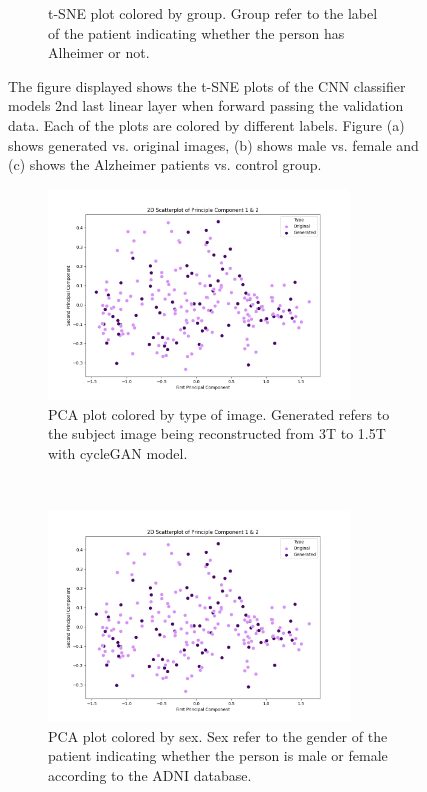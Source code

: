 \documentclass[12pt, fleqn, titlepage]{article}
\newcommand{\1}[1]{\mathds{1}\left[#1\right]}
\begin{document}
\begin{figure}[H]
\begin{subfigure}[t]{0.5\textwidth}
	\caption{t-SNE plot colored by group. Group refer to the label of the patient indicating whether the person has Alheimer or not.}
	\end{subfigure}
	\caption{The figure displayed shows the t-SNE plots of the CNN classifier models 2nd last linear layer when forward passing the validation data. Each of the plots are colored by different labels. Figure (a) shows generated vs. original images, (b) shows male vs. female and (c) shows the Alzheimer patients vs. control group. }
		\label{fig:tsne_gen}
\end{figure}


\begin{figure}[H]
	\centering
	\begin{subfigure}[t]{0.59\textwidth}
		\centering
		\includegraphics[height=2.2in]{imgs/classifier/with_generated_imgs_pca_type}%
		\caption{PCA plot colored by type of image. Generated refers to the subject image being reconstructed from 3T to 1.5T with cycleGAN model.}
	\end{subfigure}%
	~
	\begin{subfigure}[t]{0.5\textwidth}
		\centering
		\includegraphics[height=2.2in]{imgs/classifier/with_generated_imgs_pca_sex}%
		\caption{PCA plot colored by sex. Sex refer to the gender of the patient indicating whether the person is male or female according to the ADNI database.}	
	\end{subfigure}
	\begin{subfigure}[t]{0.5\textwidth}

\end{subfigure}
\end{figure}
\end{document}
